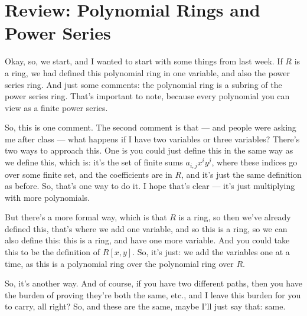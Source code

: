 \section{Review: Polynomial Rings and Power Series}

\begin{speech}[00:00:00 - 00:01:55]
Okay, so, we start, and I wanted to start with some things from last week.  If $R$ is a ring, we had defined this polynomial ring in one variable, and also the power series ring.  And just some comments: the polynomial ring is a subring of the power series ring.  That's important to note, because every polynomial you can view as a finite power series. 

So, this is one comment. The second comment is that --- and people were asking me after class --- what happens if I have two variables or three variables?  There's two ways to approach this. One is you could just define this in the same way as we define this,  which is: it's the set of finite sums $a_{i,j} x^i y^j$, where these indices go over some finite set, and the coefficients are in $R$,  and it's just the same definition as before. So, that's one way to do it. I hope that's clear --- it's just multiplying with more polynomials. 

But there's a more formal way, which is that $R$ is a ring, so then we've already defined this, that's where we add one variable,  and so this is a ring, so we can also define this: this is a ring, and have one more variable.  And you could take this to be the definition of $R[x, y]$.  So, it's just: we add the variables one at a time, as this is a polynomial ring over the polynomial ring over $R$. 

So, it's another way. And of course, if you have two different paths, then you have the burden of proving they're both the same, etc., and I leave this burden for you to carry, all right? So, and these are the same, maybe I'll just say that:  same.
\end{speech}

